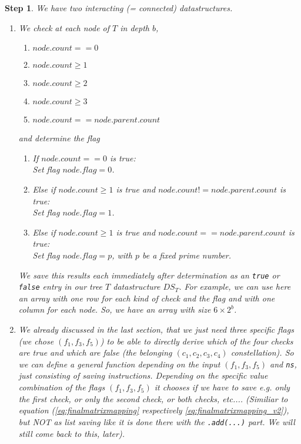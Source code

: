 \documentclass{article}
\newtheorem*{theorem A}{Theorem A}
\newtheorem*{theorem B}{N\"olker's Theorem}
\newtheorem{step}{Step}
\theoremstyle{remark}
\theoremstyle{remark}
\begin{document}
\begin{step}

    We have two interacting (= connected) datastructures.

    \begin{enumerate}

        \item We check at each node of $T$ in depth $b$, 

            \begin{enumerate}
                \item $node.count == 0$
                \item $node.count \geq 1$
                \item $node.count \geq 2$
                \item $node.count \geq 3$
                \item $node.count == node.parent.count$
            \label{enum:checks}
            \end{enumerate}

            and determine the flag

            \begin{enumerate}
                \item If $node.count == 0$ is true:\\
                    Set flag $node.flag = 0$.
                \item Else if $node.count \geq 1$ is true and $node.count != node.parent.count$ is true:\\
                    Set flag $node.flag = 1$.
                \item Else if $node.count \geq 1$ is true and $node.count == node.parent.count$ is true:\\
                    Set flag $node.flag = p$, with $p$ be a fixed prime number.
            \label{enum:flags}
            \end{enumerate}

            We save this results each immediately after determination as an \texttt{true} or \texttt{false} entry in our tree $T$ datastructure $DS_{T}$. For example, we can use here an array with one row for each kind of check and the flag and with one column for each node. So, we have an array with size $6 \times 2^{b}$.

        \item We already discussed in the last section, that we just need three specific flags (we chose $\left(f_{1}, f_{3}, f_{5}\right)$) to be able to directly derive which of the four checks are true and which are false (the belonging $\left(c_{1}, c_{2}, c_{3}, c_{4}\right)$ constellation). So we can define a general function depending on the input $\left(f_{1}, f_{3}, f_{5}\right)$ and \texttt{ns}, just consisting of saving instructions. Depending on the specific value combination of the flags $\left(f_{1}, f_{3}, f_{5}\right)$ it chooses if we have to save e.g. only the first check, or only the second check, or both checks, etc....  (Similiar to equation (\ref{eq:finalmatrixmapping} respectively \ref{eq:finalmatrixmapping_v2}), but NOT as list saving like it is done there with the \texttt{.add(...)} part. We will still come back to this, later).


\end{enumerate}
\end{step}
\end{document}
